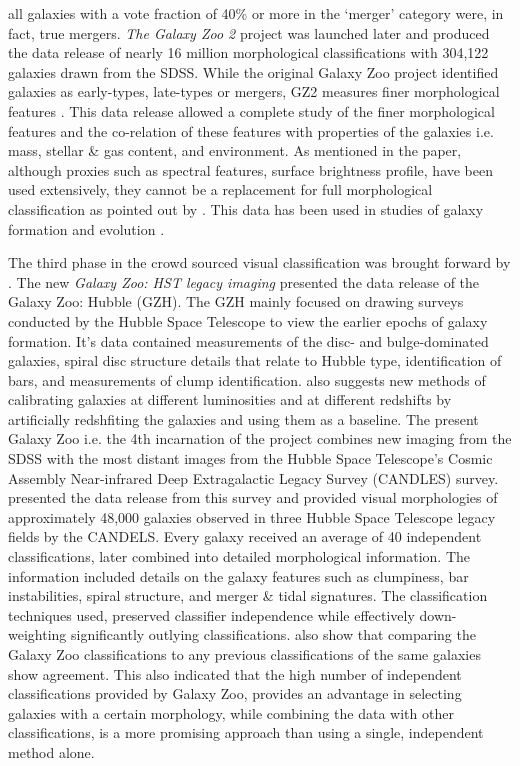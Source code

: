\documentclass[fleqn,usenatbib]{mnras}
\begin{document}
all galaxies with a vote fraction of 40\% or more in the
‘merger’ category were, in fact, true mergers. \textit{The Galaxy Zoo 2} project was launched later and \citet{Willett_2013} produced the data release of nearly 16 million morphological classifications with 304,122 galaxies drawn from the SDSS. While the original Galaxy Zoo project identified galaxies as early-types, late-types or mergers, GZ2 measures finer morphological features \citep{Willett_2013}. This data release allowed a complete study of the finer morphological features and the co-relation of these features with properties of the galaxies i.e. mass, stellar \& gas content, and environment. As mentioned in the paper, although proxies such as spectral features, surface brightness profile, have been used extensively, they cannot be a replacement for full morphological classification as pointed out by \citet{Lintott_2010}. This data has been used in studies of galaxy formation and evolution \citep{Land_et_all_2008,Schawinski,Willett_2015}. 

The third phase in the crowd sourced visual classification was brought forward by \citet{Willet2016HST}. The new \textit{Galaxy Zoo: HST legacy imaging} presented the data release of the Galaxy Zoo: Hubble (GZH). The GZH mainly focused on drawing surveys conducted by the Hubble Space Telescope to view the earlier epochs of galaxy formation. It's data contained measurements of the disc- and bulge-dominated galaxies, spiral disc structure details that relate to Hubble type, identification of bars, and measurements of clump identification. \citet{Willet2016HST} also suggests new methods of calibrating galaxies at different luminosities and at different redshifts by artificially redshfiting the galaxies and using them as a baseline. The present Galaxy Zoo i.e. the 4th incarnation of the project combines new imaging from the SDSS with the most distant images from the Hubble Space Telescope's Cosmic Assembly Near-infrared Deep Extragalactic Legacy Survey (CANDLES) survey. \citet{Simmons2016CANDLES} presented the data release from this survey and provided visual morphologies of approximately 48,000 galaxies observed in
three Hubble Space Telescope legacy fields by the CANDELS. Every galaxy received an average of 40 independent classifications, later combined into detailed morphological information. The information included details on the galaxy features such as clumpiness, bar instabilities, spiral structure, and merger \& tidal signatures. The classification techniques used, preserved classifier independence while effectively down-weighting significantly outlying classifications. \citet{Simmons2016CANDLES} also show that comparing the Galaxy Zoo classifications to any previous classifications of the same galaxies show agreement. This also indicated that the high number of independent classifications provided by Galaxy Zoo, provides an advantage in selecting galaxies with a certain morphology, while combining the data with other classifications, is a more promising approach than using a single, independent method alone.
\end{document}
